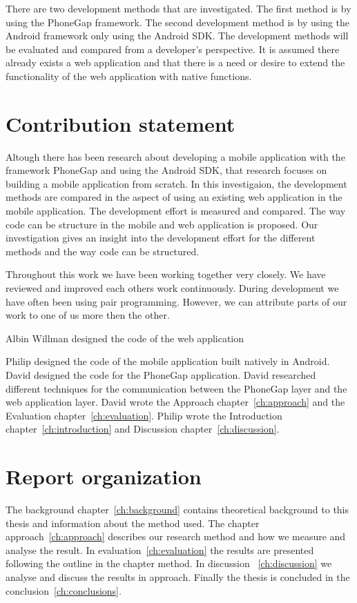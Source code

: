 There are two development methods that are investigated. The first method is by using the PhoneGap framework. The second development method is by using the Android framework only using the Android SDK. The development methods will be evaluated and compared from a developer's perspective. It is assumed there already exists	a web application and that there is a need or desire to extend the functionality of the web application with native functions.

\section{Contribution statement}\label{sec:contribution-statement}
Altough there has been research about developing a mobile application with the framework PhoneGap and using the Android SDK, that research focuses on building a mobile application from scratch. In this investigaion, the development methods are compared in the aspect of using an existing web application in the mobile application. The development effort is measured and compared. The way code can be structure in the mobile and web application is proposed. Our investigation gives an insight into the development effort for the different methods and the way code can be structured.

Throughout this work we have been working together very closely. We have reviewed and improved each others work continuously. During development we have often been using pair programming. However, we can attribute parts of our work to one of us more then the other.

Albin Willman designed the code of the web application

Philip designed the code of the mobile application built natively in Android. David designed the code for the PhoneGap application. David researched different techniques for the communication between the PhoneGap layer and the web application layer. David wrote the Approach chapter~\ref{ch:approach} and the Evaluation chapter~\ref{ch:evaluation}. Philip wrote the Introduction chapter~\ref{ch:introduction} and Discussion chapter~\ref{ch:discussion}.

\section{Report organization}\label{sec:report-organization}
The background chapter~\ref{ch:background} contains theoretical background to this thesis and information about the method used. The chapter approach~\ref{ch:approach} describes our research method and how we measure and analyse the result. In evaluation~\ref{ch:evaluation} the results are presented following the outline in the chapter method. In discussion ~\ref{ch:discussion} we analyse and discuss the results in approach. Finally the thesis is concluded in the conclusion~\ref{ch:conclusions}.
